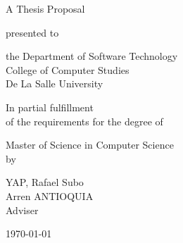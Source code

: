 %
%
%                 

\begin{titlepage}
\centering



\vspace{1.5cm}

A Thesis Proposal\\

\vspace{0.5cm}

presented to\\

\vspace{0.5cm}

the Department of Software Technology\\
College of Computer Studies\\
De La Salle University

\vspace{1cm}

In partial fulfillment\\
of the requirements for the degree of\\

\vspace{0.5cm}

Master of Science in Computer Science
\vspace{1.75cm}
\\by\\


\vspace{1cm}

YAP, Rafael Subo  \\

\vspace{1.75cm}
Arren ANTIOQUIA \\
Adviser

\vspace{1.75cm}
\today
\end{titlepage}

